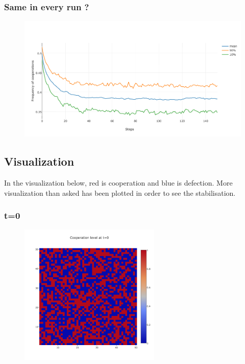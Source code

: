 \documentclass[11pt]{article}
\begin{document}
\subsubsection{Same in every run ?}

\begin{figure}[H]
\centering
   \includegraphics[width=\textwidth]{img/part2/part2-moore-notmyself-std.png}
\end{figure}

\subsection{Visualization}

In the visualization below, red is cooperation and blue is defection. More visualization than asked has been plotted in order to see the stabilisation.

\subsubsection{t=0}

\begin{figure}[H]
\centering
   \includegraphics[width=0.6\textwidth]{img/part2/part2-moore-visu-0.png}
\end{figure}
\end{document}
